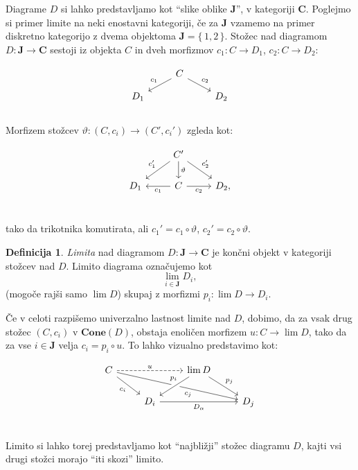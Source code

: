 \documentclass[12pt,a4paper]{book}
\theoremstyle{definition}
\newtheorem{definicija}{Definicija}[chapter]
\theoremstyle{plain}
\theoremstyle{definition}
\theoremstyle{remark}
\newcommand{\cat}[1]{\textbf{#1}}
\renewcommand{\set}[1]{\{\,#1\,\}}
\begin{document}
Diagrame $D$ si lahko predstavljamo kot "`slike oblike $\cat{J}$"', v kategoriji $\cat{C}$. Poglejmo si primer limite na neki enostavni kategoriji, če za $\cat{J}$ vzamemo na primer diskretno kategorijo z dvema objektoma $\cat{J} = \set{1,2}$. Stožec nad diagramom $D : \cat{J} \to \cat{C}$ sestoji iz objekta $C$ in dveh morfizmov $c_1 : C \to D_1$, $c_2 : C \to D_2$:

$$\begin{tikzcd}[column sep=normal, row sep=small]
& C \ar[dl, "c_1"'] \ar[dr, "c_2"] & \\
D_1 && D_2 \\
\end{tikzcd}$$

Morfizem stožcev $\vartheta : (C,c_i) \to (C', c_i')$ zgleda kot:

$$\begin{tikzcd}
& C' \ar[dl, "c_1'"'] \ar[d, "\vartheta"] \ar[dr, "c_2'"] & \\
D_1 & C \ar[l, "c_1"] \ar[r, "c_2"'] & D_2, \\
\end{tikzcd}$$

tako da trikotnika komutirata, ali $c_1' = c_1 \circ \vartheta$, $c_2' = c_2 \circ \vartheta$.

\begin{definicija}
\emph{Limita} nad diagramom $D : \cat{J} \to \cat{C}$ je končni objekt v kategoriji stožcev nad $D$. Limito diagrama označujemo kot
$$\lim_{i \in \cat{J}}D_i,$$
(mogoče rajši samo $\lim D$)
skupaj z morfizmi $p_i : \lim D \to D_i$.
\end{definicija}

Če v celoti razpišemo univerzalno lastnost limite nad $D$, dobimo, da za vsak drug stožec $(C,c_i)$ v $\cat{Cone}(D)$, obstaja enoličen morfizem $u : C \to \lim D$, tako da za vse $i \in \cat{J}$ velja $c_i = p_i \circ u$. To lahko vizualno predstavimo kot:

$$\begin{tikzcd}
C \ar[rr, dashed, "u"] \ar[drrr, pos=7/11, "c_j"'] \ar[dr, "c_i"'] & & \lim D \ar[dl, crossing over, pos=1/3, "p_i"'] \ar[dr, "p_j"] \\
& D_i \ar[rr, "D_\alpha"'] & & D_j \\
\end{tikzcd}$$

Limito si lahko torej predstavljamo kot "`najbližji"' stožec diagramu $D$, kajti vsi drugi stožci morajo "`iti skozi"' limito. 
\end{document}
